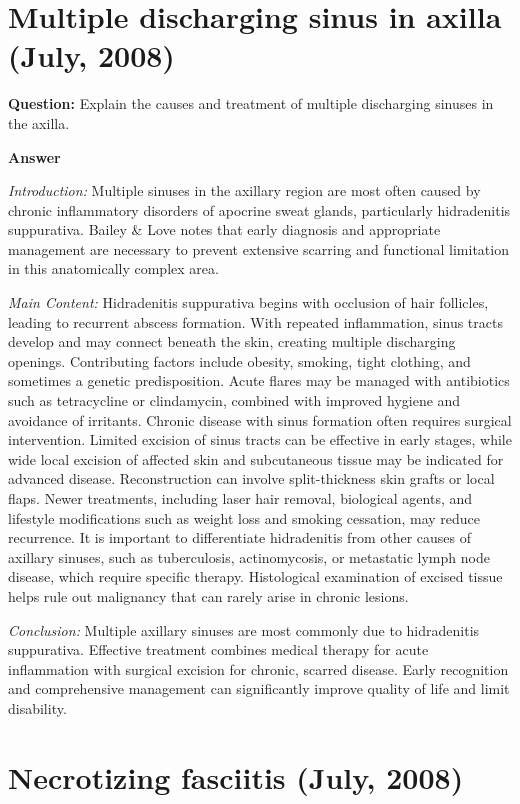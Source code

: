 \documentclass{article}
\begin{document}
\section{Multiple discharging sinus in axilla (July, 2008)}


\textbf{Question:} Explain the causes and treatment of multiple discharging sinuses in the axilla.

\textbf{Answer}

\emph{Introduction:} Multiple sinuses in the axillary region are most often caused by chronic inflammatory disorders of apocrine sweat glands, particularly hidradenitis suppurativa. Bailey \& Love notes that early diagnosis and appropriate management are necessary to prevent extensive scarring and functional limitation in this anatomically complex area.

\emph{Main Content:} Hidradenitis suppurativa begins with occlusion of hair follicles, leading to recurrent abscess formation. With repeated inflammation, sinus tracts develop and may connect beneath the skin, creating multiple discharging openings. Contributing factors include obesity, smoking, tight clothing, and sometimes a genetic predisposition. Acute flares may be managed with antibiotics such as tetracycline or clindamycin, combined with improved hygiene and avoidance of irritants. Chronic disease with sinus formation often requires surgical intervention. Limited excision of sinus tracts can be effective in early stages, while wide local excision of affected skin and subcutaneous tissue may be indicated for advanced disease. Reconstruction can involve split-thickness skin grafts or local flaps. Newer treatments, including laser hair removal, biological agents, and lifestyle modifications such as weight loss and smoking cessation, may reduce recurrence. It is important to differentiate hidradenitis from other causes of axillary sinuses, such as tuberculosis, actinomycosis, or metastatic lymph node disease, which require specific therapy. Histological examination of excised tissue helps rule out malignancy that can rarely arise in chronic lesions.

\emph{Conclusion:} Multiple axillary sinuses are most commonly due to hidradenitis suppurativa. Effective treatment combines medical therapy for acute inflammation with surgical excision for chronic, scarred disease. Early recognition and comprehensive management can significantly improve quality of life and limit disability.


\section{Necrotizing fasciitis (July, 2008)}
\end{document}
